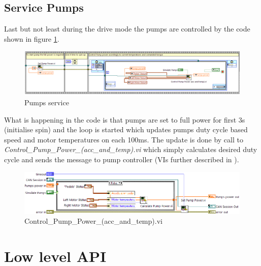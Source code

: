 \subsection{Service Pumps}
Last but not least during the drive mode the pumps are controlled by the code shown in figure \ref{pumps_service}.
\begin{figure}[H]
    \centering
    \includegraphics[scale=\visc,max width=\textwidth]{figures/Pumps}
    \caption{Pumps service}
    \label{pumps_service}
\end{figure}
What is happening in the code is that pumps are set to full power for first 3s (initialise spin) and the loop is started which updates pumps duty cycle based speed and motor temperatures on each 100ms.
The update is done by call to \textit{Control\_Pump\_Power\-\_(acc\_and\_temp).vi} which simply calculates desired duty cycle and sends the message to pump controller (VIs further described in ).
\begin{figure}[H]
    \centering
    \includegraphics[scale=\visc,max width=\textwidth]{figures/Control_Pump_Power_(acc_and_temp)d_e}
    \caption{Control\_Pump\_Power\_(acc\_and\_temp).vi}
    \label{vi:Control_Pump_Power_(acc_and_temp)}
\end{figure}

\section{Low level API}
